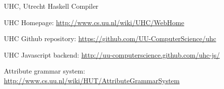 \begin{hcarentry}{UHC, Utrecht Haskell Compiler}
\FurtherReading
\begin{compactitem}
\item UHC Homepage:
\url{http://www.cs.uu.nl/wiki/UHC/WebHome}

\item UHC Github repository:
\url{https://github.com/UU-ComputerScience/uhc}

\item UHC Javascript backend:
\url{http://uu-computerscience.github.com/uhc-js/}

\item Attribute grammar system:
\url{http://www.cs.uu.nl/wiki/HUT/AttributeGrammarSystem}

\end{compactitem}
\end{hcarentry}

